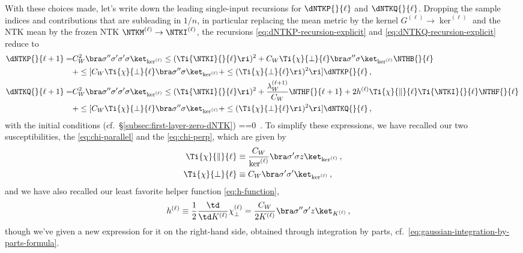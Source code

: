 With these choices made, let's write down the leading single-input 
recursions for  $\dNTKP{}{\ell}$ and $\dNTKQ{}{\ell}$. Dropping the sample indices and contributions that are subleading in $1/n$, in particular replacing the mean metric by the kernel $G^{(\ell)} \to \ker^{(\ell)}$ and the NTK mean by the frozen NTK $\NTKM^{(\ell)} \to \NTKI^{(\ell)}$,
the recursions \eqref{eq:dNTKP-recursion-explicit} and \eqref{eq:dNTKQ-recursion-explicit} reduce to 
\begin{align}
\dNTKP{}{\ell+1}=&C_W^2\bra\sigma^{\prime\prime}\sigma^{\prime}\sigma^{\prime}\sigma\ket_{\ker^{(\ell)}}\le( \Ti{\NTKI}{}{\ell} \ri)^2 + C_W \Ti{\chi}{\perp}{\ell}\bra\sigma^{\prime\prime}\sigma\ket_{\ker^{(\ell)}} \NTHB{}{\ell} \, \notag \\
 &+\le[C_W \Ti{\chi}{\perp}{\ell} \bra\sigma^{\prime\prime}\sigma\ket_{\ker^{(\ell)}}+ \le(\Ti{\chi}{\perp}{\ell}\ri)^2 \ri]\dNTKP{}{\ell}  \, , \label{eq:dNTKP-recursion-single-input}\\
\dNTKQ{}{\ell+1}=&C_W^2\bra\sigma^{\prime\prime}\sigma^{\prime}\sigma^{\prime}\sigma\ket_{\ker^{(\ell)}}\le( \Ti{\NTKI}{}{\ell}\ri)^2
+\frac{\lambda_{W}^{(\ell+1)}}{C_W} \NTHF{}{\ell+1}
+ 2 h^{(\ell)} \Ti{\chi}{\parallel}{\ell} \Ti{\NTKI}{}{\ell}\NTHF{}{\ell}
\, \label{eq:dNTKQ-recursion-single-input} \notag \\
&+ \le[C_W \Ti{\chi}{\perp}{\ell} \bra\sigma^{\prime\prime}\sigma\ket_{\ker^{(\ell)}}+\le(\Ti{\chi}{\perp}{\ell}\ri)^2 \ri]\dNTKQ{}{\ell}\, , 
\end{align}
with the initial conditions (cf.~\S\ref{subsec:first-layer-zero-dNTK})
\be\label{eq:dntk-initial-conditions}
==0\, .
\ee
To simplify these expressions, we have recalled our two susceptibilities, the  \eqref{eq:chi-parallel} and the  \eqref{eq:chi-perp}, 
which are given by
\begin{align}
\Ti{\chi}{\parallel}{\ell}  &\equiv \frac{C_W}{\ker^{(\ell)}} \bra \sigma^\prime \sigma  z \ket_{\ker^{(\ell)}} \, , \\
\Ti{\chi}{\perp}{\ell} 
&\equiv  C_W\bra\sigma^{\prime}\sigma^{\prime}\ket_{\ker^{(\ell)}}\, , 
\end{align}
and we have also recalled our least favorite helper function \eqref{eq:h-function},
\begin{align}
h^{(\ell)}&\equiv \frac{1}{2}\frac{\td }{\td K^{(\ell)}}\chi_{\perp}^{(\ell)} = \frac{C_W}{2K^{(\ell)}} \bra   \sigma^{\prime\prime} \sigma^\prime  z \ket_{K^{(\ell)}} \, ,\label{eq:h-function-reprint-new}
\end{align}
though we've given a new expression for it on the right-hand side, obtained through integration by parts, cf.~\eqref{eq:gaussian-integration-by-parts-formula}.





